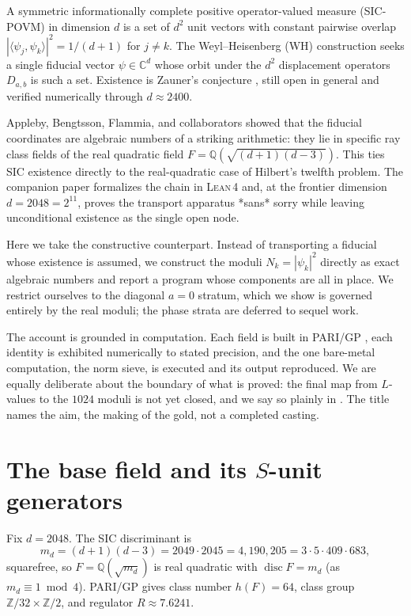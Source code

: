 \documentclass[12pt,a4paper]{article}
\newcommand{\Fd}{F}
\newcommand{\md}{m_d}
\newcommand{\Lean}{\textsc{Lean\,4}}
\begin{document}
A symmetric informationally complete positive operator-valued measure
(SIC-POVM) in dimension $d$ is a set of $d^2$ unit vectors with constant
pairwise overlap $|\langle \psi_j, \psi_k\rangle|^2 = 1/(d+1)$ for $j\neq k$.
The Weyl--Heisenberg (WH) construction seeks a single fiducial vector
$\psi\in\mathbb{C}^d$ whose orbit under the $d^2$ displacement operators
$D_{a,b}$ is such a set.  Existence is Zauner's conjecture \cite{Zauner1999},
still open in general and verified numerically through $d\approx 2400$.

Appleby, Bengtsson, Flammia, and collaborators
\cite{Appleby2013,Appleby2017,AFMY2020} showed that the fiducial coordinates
are algebraic numbers of a striking arithmetic: they lie in specific ray class
fields of the real quadratic field $\Fd = \mathbb{Q}(\sqrt{(d+1)(d-3)})$.  This
ties SIC existence directly to the real-quadratic case of Hilbert's twelfth
problem.  The companion paper \cite{StarkHilbert12} formalizes the chain in
\Lean{} and, at the frontier dimension $d=2048=2^{11}$, proves the transport
apparatus *sans* sorry while leaving unconditional existence as the single open
node.

Here we take the constructive counterpart.  Instead of transporting a fiducial
whose existence is assumed, we construct the moduli $N_k = |\psi_k|^2$ directly
as exact algebraic numbers and report a program whose components are all in
place.  We restrict ourselves to the diagonal $a=0$ stratum, which we show is
governed entirely by the real moduli; the phase strata are deferred to sequel
work.

The account is grounded in computation.  Each field is built in PARI/GP
\cite{PARI}, each identity is exhibited numerically to stated precision, and
the one bare-metal computation, the norm sieve, is executed and its output
reproduced.  We are equally deliberate about the boundary of what is proved: the
final map from $L$-values to the $1024$ moduli is not yet closed, and we say so
plainly in .  The title names the aim, the making of the gold,
not a completed casting.

\section{The base field and its $S$-unit generators}
\label{sec:base}

Fix $d=2048$.  The SIC discriminant is
\[
\md = (d+1)(d-3) = 2049\cdot 2045 = 4{,}190{,}205 = 3\cdot 5\cdot 409\cdot 683,
\]
squarefree, so $\Fd=\mathbb{Q}(\sqrt{\md})$ is real quadratic with
$\operatorname{disc}\Fd = \md$ (as $\md\equiv 1 \bmod 4$).  PARI/GP gives class
number $h(\Fd)=64$, class group $\mathbb{Z}/32\times\mathbb{Z}/2$, and
regulator $R \approx 7.6241$.
\end{document}
